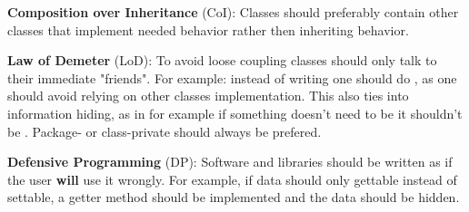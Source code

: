 \documentclass{article}
\begin{document}
\begin{enumerate}
        \textbf{Composition over Inheritance} (CoI):\newline
        Classes should preferably contain other classes that implement needed behavior rather
        then inheriting behavior.

        \textbf{Law of Demeter} (LoD):\newline
        To avoid loose coupling classes should only talk to their immediate "friends".\newline
        For example: instead of writing  one should do ,
        as one should avoid relying on other classes implementation. This also ties into
        information hiding, as in for example if something doesn't need to be  it shouldn't
        be . Package- or class-private should always be prefered.

        \textbf{Defensive Programming} (DP):\newline
        Software and libraries should be written as if the user \textbf{will} use it wrongly.
        For example, if data should only gettable instead of settable, a getter method
        should be implemented and the data should be hidden.
\end{enumerate}
\newpage
\end{document}
